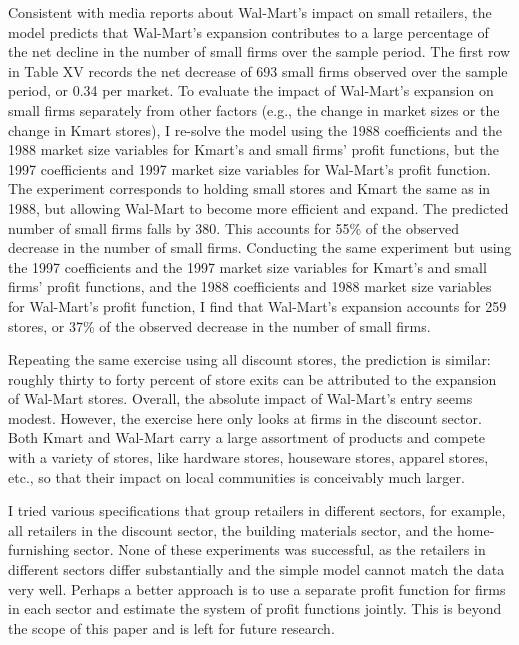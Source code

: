 \documentclass[notitlepage,onecolumn,11pt]{article}
\begin{document}
Consistent with media reports about Wal-Mart's impact on small retailers,
the model predicts that Wal-Mart's expansion contributes to a large
percentage of the net decline in the number of small firms over the sample
period. The first row in Table XV records the net decrease of 693 small
firms observed over the sample period, or 0.34 per market. To evaluate the
impact of Wal-Mart's expansion on small firms separately from other factors
(e.g., the change in market sizes or the change in Kmart stores), I re-solve
the model using the 1988 coefficients and the 1988 market size variables for
Kmart's and small firms' profit functions, but the 1997 coefficients and
1997 market size variables for Wal-Mart's profit function. The experiment
corresponds to holding small stores and Kmart the same as in 1988, but
allowing Wal-Mart to become more efficient and expand. The predicted number
of small firms falls by 380. This accounts for 55\% of the observed decrease
in the number of small firms. Conducting the same experiment but using the
1997 coefficients and the 1997 market size variables for Kmart's and small
firms' profit functions, and the 1988 coefficients and 1988 market size
variables for Wal-Mart's profit function, I find that Wal-Mart's expansion
accounts for 259 stores, or 37\% of the observed decrease in the number of
small firms.

Repeating the same exercise using all discount stores, the prediction is
similar: roughly thirty to forty percent of store exits can be attributed to
the expansion of Wal-Mart stores. Overall, the absolute impact of Wal-Mart's
entry seems modest. However, the exercise here only looks at firms in the
discount sector. Both Kmart and Wal-Mart carry a large assortment of
products and compete with a variety of stores, like hardware stores,
houseware stores, apparel stores, etc., so that their impact on local
communities is conceivably much larger.

I tried various specifications that group retailers in different sectors,
for example, all retailers in the discount sector, the building materials
sector, and the home-furnishing sector. None of these experiments was
successful, as the retailers in different sectors differ substantially and
the simple model cannot match the data very well. Perhaps a better approach
is to use a separate profit function for firms in each sector and estimate
the system of profit functions jointly. This is beyond the scope of this
paper and is left for future research.
\end{document}
